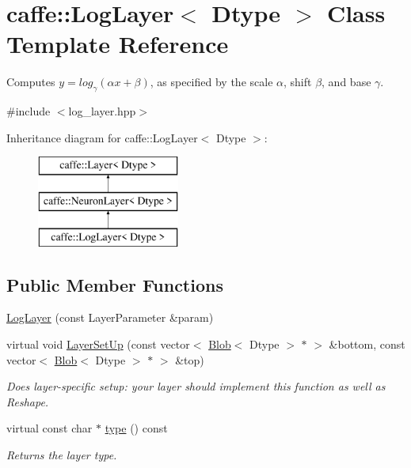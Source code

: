 \hypertarget{classcaffe_1_1LogLayer}{}\section{caffe\+:\+:Log\+Layer$<$ Dtype $>$ Class Template Reference}
\label{classcaffe_1_1LogLayer}


Computes $ y = log_{\gamma}(\alpha x + \beta) $, as specified by the scale $ \alpha $, shift $ \beta $, and base $ \gamma $.  




{\ttfamily \#include $<$log\+\_\+layer.\+hpp$>$}

Inheritance diagram for caffe\+:\+:Log\+Layer$<$ Dtype $>$\+:\begin{figure}[H]
\begin{center}
\leavevmode
\includegraphics[height=3.000000cm]{classcaffe_1_1LogLayer}
\end{center}
\end{figure}
\subsection*{Public Member Functions}
\begin{DoxyCompactItemize}
\item 
\hyperlink{classcaffe_1_1LogLayer_aa6f92a0b12140d70a44a2bcb71bab552}{Log\+Layer} (const Layer\+Parameter \&param)
\item 
virtual void \hyperlink{classcaffe_1_1LogLayer_ab3f8854a38095f499e44ad8edf15b97b}{Layer\+Set\+Up} (const vector$<$ \hyperlink{classcaffe_1_1Blob}{Blob}$<$ Dtype $>$ $\ast$ $>$ \&bottom, const vector$<$ \hyperlink{classcaffe_1_1Blob}{Blob}$<$ Dtype $>$ $\ast$ $>$ \&top)
\begin{DoxyCompactList}\small\item\em Does layer-\/specific setup\+: your layer should implement this function as well as Reshape. \end{DoxyCompactList}\item 
virtual const char $\ast$ \hyperlink{classcaffe_1_1LogLayer_a35fe9f30bc494fb930aa0c7a19dadace}{type} () const \hypertarget{classcaffe_1_1LogLayer_a35fe9f30bc494fb930aa0c7a19dadace}{}\label{classcaffe_1_1LogLayer_a35fe9f30bc494fb930aa0c7a19dadace}

\begin{DoxyCompactList}\small\item\em Returns the layer type. \end{DoxyCompactList}\end{DoxyCompactItemize}
